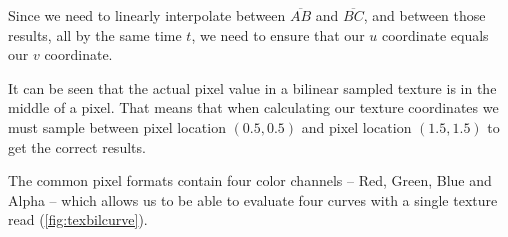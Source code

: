 \documentclass{jcgt}
\begin{document}
Since we need to linearly interpolate between {$\overline{AB}$} and {$\overline{BC}$}, and between those results, all by the same time $t$, we need to ensure that our $u$ coordinate equals our $v$ coordinate.

It can be seen that the actual pixel value in a bilinear sampled texture is in the middle of a pixel.  That means that when calculating our texture coordinates we must sample between pixel location $(0.5,0.5)$ and pixel location $(1.5,1.5)$ to get the correct results.

The common pixel formats contain four color channels – Red, Green, Blue and Alpha – which allows us to be able to evaluate four curves with a single texture read (\autoref{fig:texbilcurve}).

  \begin{figure}
\end{figure}
\end{document}
